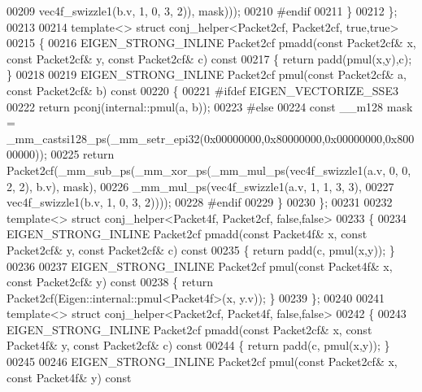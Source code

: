 \begin{DoxyCode}
00209                                                       vec4f\_swizzle1(b.v, 1, 0, 3, 2)), mask)));
00210 \textcolor{preprocessor}{    #endif}
00211   \}
00212 \};
00213 
00214 \textcolor{keyword}{template}<> \textcolor{keyword}{struct }conj\_helper<Packet2cf, Packet2cf, true,true>
00215 \{
00216   EIGEN\_STRONG\_INLINE Packet2cf pmadd(\textcolor{keyword}{const} Packet2cf& x, \textcolor{keyword}{const} Packet2cf& y, \textcolor{keyword}{const} Packet2cf& c)\textcolor{keyword}{ const}
00217 \textcolor{keyword}{  }\{ \textcolor{keywordflow}{return} padd(pmul(x,y),c); \}
00218 
00219   EIGEN\_STRONG\_INLINE Packet2cf pmul(\textcolor{keyword}{const} Packet2cf& a, \textcolor{keyword}{const} Packet2cf& b)\textcolor{keyword}{ const}
00220 \textcolor{keyword}{  }\{
00221 \textcolor{preprocessor}{    #ifdef EIGEN\_VECTORIZE\_SSE3}
00222     \textcolor{keywordflow}{return} pconj(internal::pmul(a, b));
00223 \textcolor{preprocessor}{    #else}
00224     \textcolor{keyword}{const} \_\_m128 mask = \_mm\_castsi128\_ps(\_mm\_setr\_epi32(0x00000000,0x80000000,0x00000000,0x80000000));
00225     \textcolor{keywordflow}{return} Packet2cf(\_mm\_sub\_ps(\_mm\_xor\_ps(\_mm\_mul\_ps(vec4f\_swizzle1(a.v, 0, 0, 2, 2), b.v), mask),
00226                                 \_mm\_mul\_ps(vec4f\_swizzle1(a.v, 1, 1, 3, 3),
00227                                            vec4f\_swizzle1(b.v, 1, 0, 3, 2))));
00228 \textcolor{preprocessor}{    #endif}
00229   \}
00230 \};
00231 
00232 \textcolor{keyword}{template}<> \textcolor{keyword}{struct }conj\_helper<Packet4f, Packet2cf, false,false>
00233 \{
00234   EIGEN\_STRONG\_INLINE Packet2cf pmadd(\textcolor{keyword}{const} Packet4f& x, \textcolor{keyword}{const} Packet2cf& y, \textcolor{keyword}{const} Packet2cf& c)\textcolor{keyword}{ const}
00235 \textcolor{keyword}{  }\{ \textcolor{keywordflow}{return} padd(c, pmul(x,y)); \}
00236 
00237   EIGEN\_STRONG\_INLINE Packet2cf pmul(\textcolor{keyword}{const} Packet4f& x, \textcolor{keyword}{const} Packet2cf& y)\textcolor{keyword}{ const}
00238 \textcolor{keyword}{  }\{ \textcolor{keywordflow}{return} Packet2cf(Eigen::internal::pmul<Packet4f>(x, y.v)); \}
00239 \};
00240 
00241 \textcolor{keyword}{template}<> \textcolor{keyword}{struct }conj\_helper<Packet2cf, Packet4f, false,false>
00242 \{
00243   EIGEN\_STRONG\_INLINE Packet2cf pmadd(\textcolor{keyword}{const} Packet2cf& x, \textcolor{keyword}{const} Packet4f& y, \textcolor{keyword}{const} Packet2cf& c)\textcolor{keyword}{ const}
00244 \textcolor{keyword}{  }\{ \textcolor{keywordflow}{return} padd(c, pmul(x,y)); \}
00245 
00246   EIGEN\_STRONG\_INLINE Packet2cf pmul(\textcolor{keyword}{const} Packet2cf& x, \textcolor{keyword}{const} Packet4f& y)\textcolor{keyword}{ const}

\end{DoxyCode}
